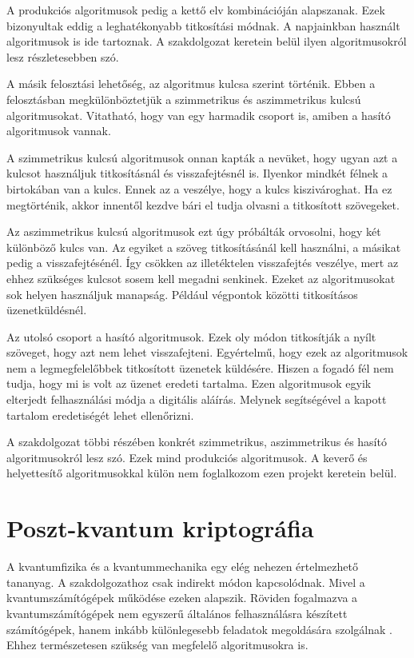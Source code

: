 \documentclass[12pt]{report} %
\begin{document}
A produkciós algoritmusok pedig a kettő elv kombinációján alapszanak. Ezek bizonyultak eddig a leghatékonyabb titkosítási módnak. A napjainkban használt algoritmusok is ide tartoznak. A szakdolgozat keretein belül ilyen algoritmusokról lesz részletesebben szó.

A másik felosztási lehetőség, az algoritmus kulcsa szerint történik. Ebben a felosztásban megkülönböztetjük a szimmetrikus és aszimmetrikus kulcsú algoritmusokat. Vitatható, hogy van egy harmadik csoport is, amiben a hasító algoritmusok vannak.

A szimmetrikus kulcsú algoritmusok onnan kapták a nevüket, hogy ugyan azt a kulcsot használjuk titkosításnál és visszafejtésnél is. Ilyenkor mindkét félnek a birtokában van a kulcs. Ennek az a veszélye, hogy a kulcs kiszivároghat. Ha ez megtörténik, akkor innentől kezdve bári el tudja olvasni a titkosított szövegeket.

Az aszimmetrikus kulcsú algoritmusok ezt úgy próbálták orvosolni, hogy két különböző kulcs van. Az egyiket a szöveg titkosításánál kell használni, a másikat pedig a visszafejtésénél. Így csökken az illetéktelen visszafejtés veszélye, mert az ehhez szükséges kulcsot sosem kell megadni senkinek. Ezeket az algoritmusokat sok helyen használjuk manapság. Például végpontok közötti titkosításos üzenetküldésnél.

Az utolsó csoport a hasító algoritmusok. Ezek oly módon titkosítják a nyílt szöveget, hogy azt nem lehet visszafejteni. Egyértelmű, hogy ezek az algoritmusok nem a legmegfelelőbbek titkosított üzenetek küldésére. Hiszen a fogadó fél nem tudja, hogy mi is volt az üzenet eredeti tartalma. Ezen algoritmusok egyik elterjedt felhasználási módja a digitális aláírás. Melynek segítségével a kapott tartalom eredetiségét lehet ellenőrizni.

A szakdolgozat többi részében konkrét szimmetrikus, aszimmetrikus és hasító algoritmusokról lesz szó. Ezek mind produkciós algoritmusok. A keverő és helyettesítő algoritmusokkal külön nem foglalkozom ezen projekt keretein belül.

\section{Poszt-kvantum kriptográfia} %

A kvantumfizika és a kvantummechanika egy elég nehezen értelmezhető tananyag. A szakdolgozathoz csak indirekt módon kapcsolódnak. Mivel a kvantumszámítógépek működése ezeken alapszik. Röviden fogalmazva a kvantumszámítógépek nem egyszerű általános felhasználásra készített számítógépek, hanem inkább különlegesebb feladatok megoldására szolgálnak \cite{sslMarketBlogPostQuantum}. Ehhez természetesen szükség van megfelelő algoritmusokra is.
\end{document}
